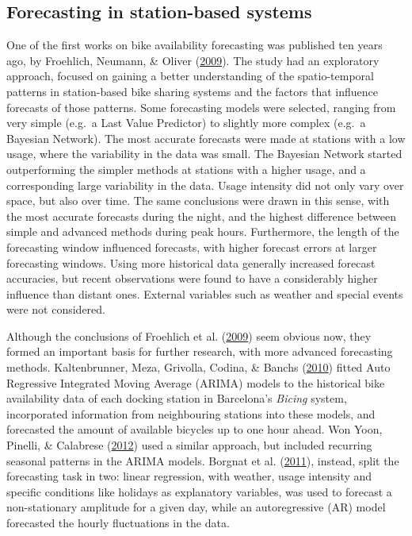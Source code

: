 \documentclass[12pt,oneside]{reedthesis}
\begin{document}
\subsection{Forecasting in station-based systems}\label{onethreeone}

One of the first works on bike availability forecasting was published
ten years ago, by Froehlich, Neumann, \& Oliver
(\protect\hyperlink{ref-froehlich2009}{2009}). The study had an
exploratory approach, focused on gaining a better understanding of the
spatio-temporal patterns in station-based bike sharing systems and the
factors that influence forecasts of those patterns. Some forecasting
models were selected, ranging from very simple (e.g.~a Last Value
Predictor) to slightly more complex (e.g.~a Bayesian Network). The most
accurate forecasts were made at stations with a low usage, where the
variability in the data was small. The Bayesian Network started
outperforming the simpler methods at stations with a higher usage, and a
corresponding large variability in the data. Usage intensity did not
only vary over space, but also over time. The same conclusions were
drawn in this sense, with the most accurate forecasts during the night,
and the highest difference between simple and advanced methods during
peak hours. Furthermore, the length of the forecasting window influenced
forecasts, with higher forecast errors at larger forecasting windows.
Using more historical data generally increased forecast accuracies, but
recent observations were found to have a considerably higher influence
than distant ones. External variables such as weather and special events
were not considered.

Although the conclusions of Froehlich et al.
(\protect\hyperlink{ref-froehlich2009}{2009}) seem obvious now, they
formed an important basis for further research, with more advanced
forecasting methods. Kaltenbrunner, Meza, Grivolla, Codina, \& Banchs
(\protect\hyperlink{ref-kaltenbrunner2010}{2010}) fitted Auto Regressive
Integrated Moving Average (ARIMA) models to the historical bike
availability data of each docking station in Barcelona's \emph{Bicing}
system, incorporated information from neighbouring stations into these
models, and forecasted the amount of available bicycles up to one hour
ahead. Won Yoon, Pinelli, \& Calabrese
(\protect\hyperlink{ref-won2012}{2012}) used a similar approach, but
included recurring seasonal patterns in the ARIMA models. Borgnat et al.
(\protect\hyperlink{ref-borgnat2011}{2011}), instead, split the
forecasting task in two: linear regression, with weather, usage
intensity and specific conditions like holidays as explanatory
variables, was used to forecast a non-stationary amplitude for a given
day, while an autoregressive (AR) model forecasted the hourly
fluctuations in the data.
\end{document}
